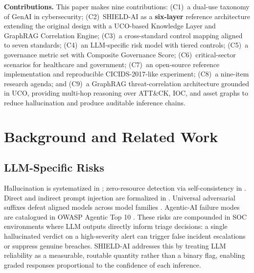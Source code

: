 \documentclass[journal]{IEEEtran}
\begin{document}
\textbf{Contributions.} This paper makes nine contributions:
(C1)~a dual-use taxonomy of GenAI in cybersecurity;
(C2)~SHIELD-AI as a \textbf{six-layer} reference architecture extending the original design
with a UCO-based Knowledge Layer and GraphRAG Correlation Engine;
(C3)~a cross-standard control mapping aligned to seven standards;
(C4)~an LLM-specific risk model with tiered controls;
(C5)~a governance metric set with Composite Governance Score;
(C6)~critical-sector scenarios for healthcare and government;
(C7)~an open-source reference implementation and reproducible CICIDS-2017-like experiment;
(C8)~a nine-item research agenda; and
(C9)~a GraphRAG threat-correlation architecture grounded in UCO, providing multi-hop reasoning
over ATT\&CK, IOC, and asset graphs to reduce hallucination and produce auditable inference
chains.

\section{Background and Related Work}
\label{sec:background}

\subsection{LLM-Specific Risks}
Hallucination is systematized in \cite{ji2023hallucination}; zero-resource detection via
self-consistency in \cite{manakul2023selfcheckgpt}. Direct and indirect prompt injection are
formalized in \cite{liu2024formalizing,greshake2023indirect}. Universal adversarial suffixes
defeat aligned models across model families \cite{zou2023universal}. Agentic-AI failure modes
are catalogued in OWASP Agentic Top 10 \cite{owasp2025agentic,owasp2025agenticthreats}.
These risks are compounded in SOC environments where LLM outputs directly inform
triage decisions: a single hallucinated verdict on a high-severity alert can trigger
false incident escalations or suppress genuine breaches. SHIELD-AI addresses this by
treating LLM reliability as a measurable, routable quantity rather than a binary flag,
enabling graded responses proportional to the confidence of each inference.
\end{document}
